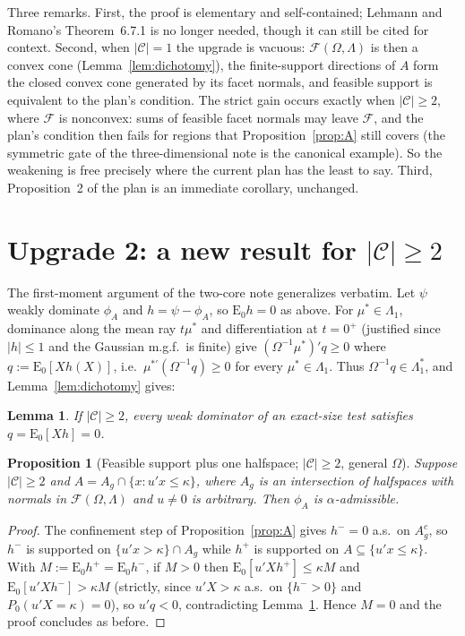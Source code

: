 \documentclass[12pt]{article}
\newtheorem{proposition}{Proposition}
\newtheorem{lemma}{Lemma}
\theoremstyle{remark}
\newcommand{\E}{\mathrm{E}}
\newcommand{\cC}{\mathcal C}
\newcommand{\cF}{\mathcal F}
\begin{document}
Three remarks. First, the proof is elementary and self-contained; Lehmann
and Romano's Theorem~6.7.1 is no longer needed, though it can still be
cited for context. Second, when $|\cC|=1$ the upgrade is vacuous:
$\cF(\Omega,\Lambda)$ is then a convex cone
(Lemma~\ref{lem:dichotomy}), the finite-support directions of $A$ form the
closed convex cone generated by its facet normals, and feasible support is
equivalent to the plan's condition. The strict gain occurs exactly when
$|\cC|\ge2$, where $\cF$ is nonconvex: sums of feasible facet normals may
leave $\cF$, and the plan's condition then fails for regions that
Proposition~\ref{prop:A} still covers (the symmetric gate of the
three-dimensional note is the canonical example). So the weakening is free
precisely where the current plan has the least to say. Third,
Proposition~2 of the plan is an immediate corollary, unchanged.

\section{Upgrade 2: a new result for $|\cC|\ge2$}

The first-moment argument of the two-core note generalizes verbatim. Let
$\psi$ weakly dominate $\phi_A$ and $h=\psi-\phi_A$, so $\E_0h=0$ as
above. For $\mu^*\in\Lambda_1$, dominance along the mean ray $t\mu^*$ and
differentiation at $t=0^+$ (justified since $|h|\le1$ and the Gaussian
m.g.f.\ is finite) give $(\Omega^{-1}\mu^*)'q\ge0$ where
$q:=\E_0[Xh(X)]$, i.e.\ $\mu^{*\prime}(\Omega^{-1}q)\ge0$ for every
$\mu^*\in\Lambda_1$. Thus $\Omega^{-1}q\in\Lambda_1^*$, and
Lemma~\ref{lem:dichotomy} gives:

\begin{lemma}\label{lem:qzero}
If $|\cC|\ge2$, every weak dominator of an exact-size test satisfies
$q=\E_0[Xh]=0$.
\end{lemma}

\begin{proposition}[Feasible support plus one halfspace; $|\cC|\ge2$,
general $\Omega$]\label{prop:B}
Suppose $|\cC|\ge2$ and $A=A_g\cap\{x:u'x\le\kappa\}$, where $A_g$ is an
intersection of halfspaces with normals in $\cF(\Omega,\Lambda)$ and
$u\ne0$ is arbitrary. Then $\phi_A$ is $\alpha$-admissible.
\end{proposition}

\begin{proof}
The confinement step of Proposition~\ref{prop:A} gives $h^-=0$ a.s.\ on
$A_g^c$, so $h^-$ is supported on $\{u'x>\kappa\}\cap A_g$ while $h^+$ is
supported on $A\subseteq\{u'x\le\kappa\}$. With
$M:=\E_0h^+=\E_0h^-$, if $M>0$ then $\E_0[u'Xh^+]\le\kappa M$ and
$\E_0[u'Xh^-]>\kappa M$ (strictly, since $u'X>\kappa$ a.s.\ on
$\{h^->0\}$ and $P_0(u'X=\kappa)=0$), so $u'q<0$, contradicting
Lemma~\ref{lem:qzero}. Hence $M=0$ and the proof concludes as before.
\end{proof}
\end{document}
